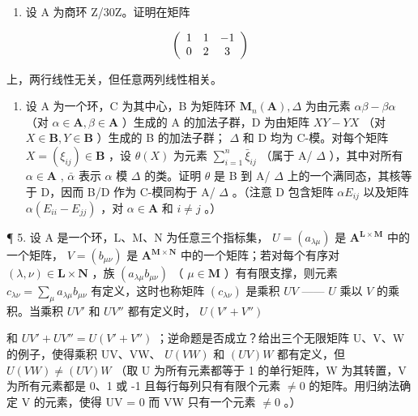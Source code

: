 \begin{enumerate}
\def\labelenumi{\arabic{enumi}.}
\setcounter{enumi}{2}
\tightlist
\item
  设 A 为商环 Z/30Z。证明在矩阵
\end{enumerate}

\[
\left( \begin{array}{c c c} 1 & 1 & - 1 \\ 0 & 2 & 3 \end{array} \right)
\]

上，两行线性无关，但任意两列线性相关。

\begin{enumerate}
\def\labelenumi{\arabic{enumi}.}
\setcounter{enumi}{3}
\tightlist
\item
  设 A 为一个环，C 为其中心，B 为矩阵环 \(\mathbf{M}_n(\mathbf{A}), \Delta\) 为由元素 \(\alpha\beta - \beta\alpha\) （对 \(\alpha \in \mathbf{A}, \beta \in \mathbf{A}\) ）生成的 A 的加法子群，D 为由矩阵 \(XY - YX\) （对 \(X \in \mathbf{B}, Y \in \mathbf{B}\) ）生成的 B 的加法子群； \(\Delta\) 和 D 均为 C-模。对每个矩阵 \(X = (\xi_{ij}) \in \mathbf{B}\) ，设 \(\theta(X)\) 为元素 \(\sum_{i=1}^{n} \bar{\xi}_{ij}\) （属于 A/ \(\Delta\) ），其中对所有 \(\alpha \in \mathbf{A}\) , \(\bar{\alpha}\) 表示 \(\alpha\) 模 \(\Delta\) 的类。证明 \(\theta\) 是 B 到 A/ \(\Delta\) 上的一个满同态，其核等于 D，因而 B/D 作为 C-模同构于 A/ \(\Delta\) 。（注意 D 包含矩阵 \(\alpha E_{ij}\) 以及矩阵 \(\alpha(E_{ii} - E_{jj})\) ，对 \(\alpha \in \mathbf{A}\) 和 \(i \neq j\) 。）
\end{enumerate}

¶ 5. 设 A 是一个环，L、M、N 为任意三个指标集， \(U = (a_{\lambda \mu})\) 是 \(\mathbf{A}^{\mathbf{L} \times \mathbf{M}}\) 中的一个矩阵， \(V = (b_{\mu \nu})\) 是 \(\mathbf{A}^{\mathbf{M} \times \mathbf{N}}\) 中的一个矩阵；若对每个有序对 \((\lambda, \nu) \in \mathbf{L} \times \mathbf{N}\) ，族 \((a_{\lambda \mu} b_{\mu \nu})\) （ \(\mu \in \mathbf{M}\) ）有有限支撑，则元素 \(c_{\lambda \nu} = \sum_{\mu} a_{\lambda \mu} b_{\mu \nu}\) 有定义，这时也称矩阵 \((c_{\lambda \nu})\) 是乘积 \(UV\) —— \(U\) 乘以 \(V\) 的乘积。当乘积 \(UV'\) 和 \(UV''\) 都有定义时， \(U(V' + V'')\)

和 \(UV' + UV'' = U(V' + V'')\) ；逆命题是否成立？给出三个无限矩阵 U、V、W 的例子，使得乘积 UV、VW、 \(U(VW)\) 和 \((UV)W\) 都有定义，但 \(U(VW) \neq (UV)W\) （取 U 为所有元素都等于 1 的单行矩阵，W 为其转置，V 为所有元素都是 0、1 或 -1 且每行每列只有有限个元素 \(\neq 0\) 的矩阵。用归纳法确定 V 的元素，使得 UV = 0 而 VW 只有一个元素 \(\neq 0\) 。）

